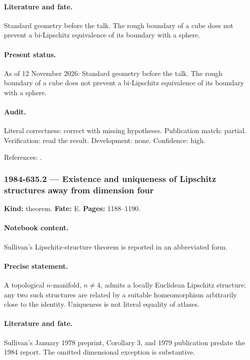 \paragraph{Literature and fate.} Standard geometry before the talk. The rough boundary of a cube does not prevent a bi-Lipschitz equivalence of its boundary with a sphere.

\paragraph{Present status.} As of 12 November 2026: Standard geometry before the talk. The rough boundary of a cube does not prevent a bi-Lipschitz equivalence of its boundary with a sphere.

\paragraph{Audit.} Literal correctness: correct with missing hypotheses. Publication match: partial. Verification: read the result. Development: none. Confidence: high.

\noindent References: \citep{sullivan1979hyperbolic}.\par

\subsubsection{1984-635.2 --- Existence and uniqueness of Lipschitz structures away from dimension four}

\label{item:1984-635.2}

\noindent\textbf{Kind:} theorem. \textbf{Fate:} E. \textbf{Pages:} 1188--1190.\par

\paragraph{Notebook content.} Sullivan's Lipschitz-structure theorem is reported in an abbreviated form.

\paragraph{Precise statement.} A topological \(n\)-manifold, \(n\ne4\), admits a locally Euclidean Lipschitz structure; any two such structures are related by a suitable homeomorphism arbitrarily close to the identity. Uniqueness is not literal equality of atlases.

\paragraph{Literature and fate.} Sullivan's January 1978 preprint, Corollary 3, and 1979 publication predate the 1984 report. The omitted dimensional exception is substantive.

